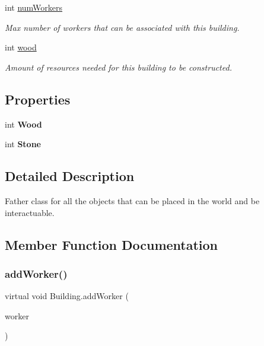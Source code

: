 \begin{DoxyCompactItemize}
int \mbox{\hyperlink{class_building_aaa4b2181ae88464dd858258051460807}{num\+Workers}}
\begin{DoxyCompactList}\small\item\em Max number of workers that can be associated with this building. \end{DoxyCompactList}\item 
int \mbox{\hyperlink{class_building_ab7873f236278124c6acdcee2bcc4b54b}{wood}}
\begin{DoxyCompactList}\small\item\em Amount of resources needed for this building to be constructed. \end{DoxyCompactList}\end{DoxyCompactItemize}
\subsection*{Properties}
\begin{DoxyCompactItemize}
\item 
\mbox{\label{class_building_a3f57dd3ced68490025e4e5dee4da8e38}} 
int {\bfseries Wood}
\item 
\mbox{\label{class_building_aff0a55b9ce0b2799e0d0937e04d5c93b}} 
int {\bfseries Stone}
\end{DoxyCompactItemize}


\subsection{Detailed Description}
Father class for all the objects that can be placed in the world and be interactuable. 



\subsection{Member Function Documentation}
\mbox{\label{class_building_a3ff7dbfd8b9062dced8438c2e83b2320}} 
\subsubsection{\texorpdfstring{add\+Worker()}{addWorker()}}
{\footnotesize\ttfamily virtual void Building.\+add\+Worker (\begin{DoxyParamCaption}\item[{Game\+Object}]{worker }\end{DoxyParamCaption})\hspace{0.3cm}{\ttfamily [virtual]}}



